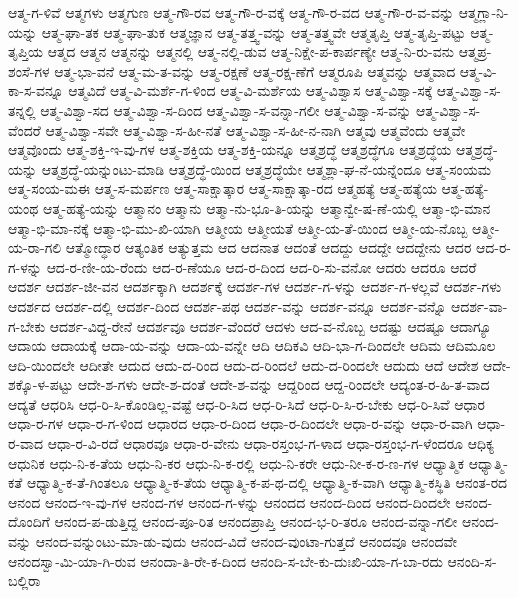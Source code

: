 {ಆತ್ಮ-ಗ-ಳಿವೆ
ಆತ್ಮಗಳು
ಆತ್ಮಗುಣ
ಆತ್ಮ-ಗೌ-ರವ
ಆತ್ಮ-ಗೌ-ರ-ವಕ್ಕೆ
ಆತ್ಮ-ಗೌ-ರ-ವದ
ಆತ್ಮ-ಗೌ-ರ-ವ-ವನ್ನು
ಆತ್ಮಗ್ಲಾ-ನಿ-ಯನ್ನು
ಆತ್ಮ-ಘಾ-ತಕ
ಆತ್ಮ-ಘಾ-ತುಕ
ಆತ್ಮಜ್ಞಾನ
ಆತ್ಮ-ತತ್ತ್ವ-ವನ್ನು
ಆತ್ಮ-ತತ್ತ್ವವೇ
ಆತ್ಮತೃಪ್ತಿ
ಆತ್ಮ-ತೃಪ್ತಿ-ಪಟ್ಟು
ಆತ್ಮ-ತೃಪ್ತಿಯ
ಆತ್ಮದ
ಆತ್ಮನ
ಆತ್ಮನನ್ನು
ಆತ್ಮನಲ್ಲಿ
ಆತ್ಮ-ನಲ್ಲಿ-ಡುವ
ಆತ್ಮ-ನಿಕ್ಷೇ-ಪ-ಕಾರ್ಪಣ್ಯೇ
ಆತ್ಮ-ನಿ-ರು-ವನು
ಆತ್ಮಪ್ರ-ಶಂಸೆ-ಗಳ
ಆತ್ಮ-ಭಾ-ವನೆ
ಆತ್ಮ-ಮ-ತ-ವನ್ನು
ಆತ್ಮ-ರಕ್ಷಣೆ
ಆತ್ಮ-ರಕ್ಷ-ಣೆಗೆ
ಆತ್ಮರೂಪಿ
ಆತ್ಮವನ್ನು
ಆತ್ಮವಾದ
ಆತ್ಮ-ವಿ-ಕಾ-ಸ-ವನ್ನೂ
ಆತ್ಮವಿದೆ
ಆತ್ಮ-ವಿ-ಮರ್ಶೆ-ಗ-ಳಿಂದ
ಆತ್ಮ-ವಿ-ಮರ್ಶೆಯ
ಆತ್ಮ-ವಿಶ್ವಾಸ
ಆತ್ಮ-ವಿಶ್ವಾ-ಸಕ್ಕೆ
ಆತ್ಮ-ವಿಶ್ವಾ-ಸ-ತನ್ನಲ್ಲಿ
ಆತ್ಮ-ವಿಶ್ವಾ-ಸದ
ಆತ್ಮ-ವಿಶ್ವಾ-ಸ-ದಿಂದ
ಆತ್ಮ-ವಿಶ್ವಾ-ಸ-ವನ್ನಾ-ಗಲೀ
ಆತ್ಮ-ವಿಶ್ವಾ-ಸ-ವನ್ನು
ಆತ್ಮ-ವಿಶ್ವಾ-ಸ-ವೆಂದರೆ
ಆತ್ಮ-ವಿಶ್ವಾ-ಸವೇ
ಆತ್ಮ-ವಿಶ್ವಾ-ಸ-ಹೀ-ನತೆ
ಆತ್ಮ-ವಿಶ್ವಾ-ಸ-ಹೀ-ನ-ನಾಗಿ
ಆತ್ಮವು
ಆತ್ಮವೆಂದು
ಆತ್ಮವೇ
ಆತ್ಮವೊಂದು
ಆತ್ಮ-ಶಕ್ತಿ-ಇ-ವು-ಗಳ
ಆತ್ಮ-ಶಕ್ತಿಯ
ಆತ್ಮ-ಶಕ್ತಿ-ಯನ್ನೂ
ಆತ್ಮಶ್ರದ್ಧೆ
ಆತ್ಮಶ್ರದ್ಧೆಗೂ
ಆತ್ಮಶ್ರದ್ಧೆಯ
ಆತ್ಮಶ್ರದ್ಧೆ-ಯನ್ನು
ಆತ್ಮಶ್ರದ್ಧೆ-ಯನ್ನುಂಟು-ಮಾಡಿ
ಆತ್ಮಶ್ರದ್ಧೆ-ಯಿಂದ
ಆತ್ಮಶ್ರದ್ಧೆಯೇ
ಆತ್ಮಶ್ಲಾ-ಘ-ನೆ-ಯನ್ನೆಂದೂ
ಆತ್ಮ-ಸಂಯಮ
ಆತ್ಮ-ಸಂಯ-ಮಈ
ಆತ್ಮ-ಸ-ಮರ್ಪಣ
ಆತ್ಮ-ಸಾಕ್ಷಾತ್ಕಾರ
ಆತ್ಮ-ಸಾಕ್ಷಾತ್ಕಾ-ರದ
ಆತ್ಮಹತ್ಯೆ
ಆತ್ಮ-ಹತ್ಯೆಯ
ಆತ್ಮ-ಹತ್ಯೆ-ಯಂಥ
ಆತ್ಮ-ಹತ್ಯೆ-ಯನ್ನು
ಆತ್ಮಾನಂ
ಆತ್ಮಾನು
ಆತ್ಮಾ-ನು-ಭೂ-ತಿ-ಯನ್ನು
ಆತ್ಮಾನ್ವೇ-ಷ-ಣೆ-ಯಲ್ಲಿ
ಆತ್ಮಾ-ಭಿ-ಮಾನ
ಆತ್ಮಾ-ಭಿ-ಮಾ-ನಕ್ಕೆ
ಆತ್ಮಾ-ಭಿ-ಮು-ಖಿ-ಯಾಗಿ
ಆತ್ಮೀಯ
ಆತ್ಮೀಯತೆ
ಆತ್ಮೀ-ಯ-ತೆ-ಯಿಂದ
ಆತ್ಮೀ-ಯ-ನೊಬ್ಬ
ಆತ್ಮೀ-ಯ-ರಾ-ಗಲಿ
ಆತ್ಮೋದ್ಧಾರ
ಆತ್ಯಂತಿಕ
ಆತ್ಯುತ್ತಮ
ಆದ
ಆದನಾತ
ಆದಂತೆ
ಆದದ್ದು
ಆದದ್ದೇ
ಆದದ್ದೇನು
ಆದರ
ಆದ-ರ-ಗ-ಳನ್ನು
ಆದ-ರ-ಣೀ-ಯ-ರೆಂದು
ಆದ-ರ-ಣೆಯೂ
ಆದ-ರ-ದಿಂದ
ಆದ-ರಿ-ಸು-ವನೋ
ಆದರು
ಆದರೂ
ಆದರೆ
ಆದರ್ಶ
ಆದರ್ಶ-ಜೀ-ವನ
ಆದರ್ಶಕ್ಕಾಗಿ
ಆದರ್ಶಕ್ಕೆ
ಆದರ್ಶ-ಗಳ
ಆದರ್ಶ-ಗ-ಳನ್ನು
ಆದರ್ಶ-ಗ-ಳಲ್ಲವೆ
ಆದರ್ಶ-ಗಳು
ಆದರ್ಶದ
ಆದರ್ಶ-ದಲ್ಲಿ
ಆದರ್ಶ-ದಿಂದ
ಆದರ್ಶ-ಪಥ
ಆದರ್ಶ-ವನ್ನು
ಆದರ್ಶ-ವನ್ನೂ
ಆದರ್ಶ-ವನ್ನೊ
ಆದರ್ಶ-ವಾ-ಗ-ಬೇಕು
ಆದರ್ಶ-ವಿದ್ದ-ರೇನೆ
ಆದರ್ಶವೂ
ಆದರ್ಶ-ವೆಂದರೆ
ಆದಳು
ಆದ-ವ-ನೊಬ್ಬ
ಆದಷ್ಟು
ಆದಷ್ಟೂ
ಆದಾಗ್ಯೂ
ಆದಾಯ
ಆದಾಯಕ್ಕೆ
ಆದಾ-ಯ-ವನ್ನು
ಆದಾ-ಯ-ವನ್ನೇ
ಆದಿ
ಆದಿಕವಿ
ಆದಿ-ಭಾ-ಗ-ದಿಂದಲೇ
ಆದಿಮ
ಆದಿಮೂಲ
ಆದಿ-ಯಿಂದಲೇ
ಆದೀತೇ
ಆದುದ
ಆದು-ದ-ರಿಂದ
ಆದು-ದ-ರಿಂದಲೆ
ಆದು-ದ-ರಿಂದಲೇ
ಆದುದು
ಆದೆ
ಆದೇಶ
ಆದೇ-ಶಕ್ಕೊ-ಳ-ಪಟ್ಟು
ಆದೇ-ಶ-ಗಳು
ಆದೇ-ಶ-ದಂತೆ
ಆದೇ-ಶ-ವನ್ನು
ಆದ್ದರಿಂದ
ಆದ್ದ-ರಿಂದಲೇ
ಆದ್ಯಂತ-ರ-ಹಿ-ತ-ವಾದ
ಆದ್ಯತೆ
ಆಧರಿಸಿ
ಆಧ-ರಿ-ಸಿ-ಕೊಂಡಿಲ್ಲ-ವಷ್ಟೆ
ಆಧ-ರಿ-ಸಿದ
ಆಧ-ರಿ-ಸಿದೆ
ಆಧ-ರಿ-ಸಿ-ರ-ಬೇಕು
ಆಧ-ರಿ-ಸಿವೆ
ಆಧಾರ
ಆಧಾ-ರ-ಗಳ
ಆಧಾ-ರ-ಗ-ಳಿಂದ
ಆಧಾರದ
ಆಧಾ-ರ-ದಿಂದ
ಆಧಾ-ರ-ದಿಂದಲೇ
ಆಧಾ-ರ-ವನ್ನು
ಆಧಾ-ರ-ವಾಗಿ
ಆಧಾ-ರ-ವಾದ
ಆಧಾ-ರ-ವಿ-ರದೆ
ಆಧಾರವೂ
ಆಧಾ-ರ-ವೇನು
ಆಧಾ-ರಸ್ತಂಭ-ಗ-ಳಾದ
ಆಧಾ-ರಸ್ತಂಭ-ಗ-ಳೆಂದರೂ
ಆಧಿಕ್ಯ
ಆಧುನಿಕ
ಆಧು-ನಿ-ಕ-ತೆಯ
ಆಧು-ನಿ-ಕರ
ಆಧು-ನಿ-ಕ-ರಲ್ಲಿ
ಆಧು-ನಿ-ಕರೇ
ಆಧು-ನೀ-ಕ-ರ-ಣ-ಗಳ
ಆಧ್ಯಾತ್ಮಿಕ
ಆಧ್ಯಾತ್ಮಿ-ಕತೆ
ಆಧ್ಯಾತ್ಮಿ-ಕ-ತೆ-ಗಿಂತಲೂ
ಆಧ್ಯಾತ್ಮಿ-ಕ-ತೆಯ
ಆಧ್ಯಾತ್ಮಿ-ಕ-ಪ-ಥ-ದಲ್ಲಿ
ಆಧ್ಯಾತ್ಮಿ-ಕ-ವಾಗಿ
ಆಧ್ಯಾತ್ಮಿ-ಕಸ್ಥಿತಿ
ಆನಂತ-ರದ
ಆನಂದ
ಆನಂದ-ಇ-ವು-ಗಳ
ಆನಂದ-ಗಳ
ಆನಂದ-ಗ-ಳನ್ನು
ಆನಂದದ
ಆನಂದ-ದಿಂದ
ಆನಂದ-ದಿಂದಲೇ
ಆನಂದ-ದೊಂದಿಗೆ
ಆನಂದ-ಪ-ಡುತ್ತಿದ್ದ
ಆನಂದ-ಪೂ-ರಿತ
ಆನಂದಪ್ರಾಪ್ತಿ
ಆನಂದ-ಭ-ರಿ-ತರೂ
ಆನಂದ-ವನ್ನಾ-ಗಲೀ
ಆನಂದ-ವನ್ನು
ಆನಂದ-ವನ್ನುಂಟು-ಮಾ-ಡು-ವುದು
ಆನಂದ-ವಿದೆ
ಆನಂದ-ವುಂಟಾ-ಗುತ್ತದೆ
ಆನಂದವೂ
ಆನಂದವೇ
ಆನಂದಸ್ವಾ-ಮಿ-ಯಾ-ಗಿ-ರುವ
ಆನಂದಾ-ತಿ-ರೇ-ಕ-ದಿಂದ
ಆನಂದಿ-ಸ-ಬೇ-ಕು-ದುಃಖಿ-ಯಾ-ಗ-ಬಾ-ರದು
ಆನಂದಿ-ಸ-ಬಲ್ಲಿರಾ
}
